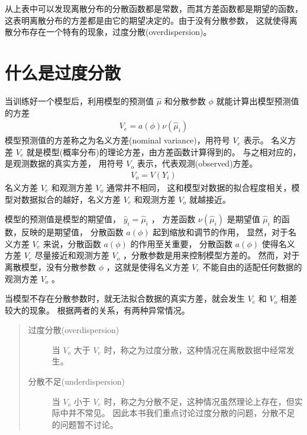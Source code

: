 \documentclass[letterpaper,10pt,english]{sphinxmanual}
\begin{document}
从上表中可以发现离散分布的分散函数都是常数，而其方差函数都是期望的函数，
这表明离散分布的方差都是由它的期望决定的。由于没有分散参数，
这就使得离散分布存在一个特有的现象，过度分散(overdispersion)。


\section{什么是过度分散}
\label{\detokenize{_u8fc7_u5ea6_u5206_u6563/content:id2}}
当训练好一个模型后，利用模型的预测值 \(\hat{\mu}\) 和分散参数 \(\phi\)
就能计算出模型预测值的方差
\begin{equation}\label{equation:过度分散/content:过度分散/content:1}
\begin{split}V_e = a(\phi)\nu(\hat{\mu}_i)\end{split}
\end{equation}
模型预测值的方差称之为名义方差(nominal variance)，用符号 \(V_{e}\) 表示。
名义方差 \(V_e\) 就是模型(概率分布)的理论方差，由方差函数计算得到的。
与之相对应的，是观测数据的真实方差，
用符号 \(V_{o}\) 表示，代表观测(observed)方差。
\begin{equation}\label{equation:过度分散/content:过度分散/content:2}
\begin{split}V_{o} = V(Y_i)\end{split}
\end{equation}
名义方差 \(V_e\) 和观测方差 \(V_{o}\) 通常并不相同，
这和模型对数据的拟合程度相关，模型对数据拟合的越好，名义方差 \(V_e\) 和观测方差 \(V_{o}\)
就越接近。

模型的预测值是模型的期望值， \(\hat{y}_i=\hat{\mu}_i\) ，
方差函数 \(\nu(\hat{\mu}_i)\) 是期望值
\(\hat{\mu}_i\) 的函数，反映的是期望值，
分散函数 \(a(\phi)\) 起到缩放和调节的作用，
显然，对于名义方差 \(V_e\) 来说，分散函数 \(a(\phi)\) 的作用至关重要，
分散函数 \(a(\phi)\) 使得名义方差 \(V_e\) 尽量接近和观测方差 \(V_{o}\)
，分散参数是用来控制模型方差的。
然而，对于离散模型，没有分散参数 \(\phi\)
，这就是使得名义方差 \(V_e\) 不能自由的适配任何数据的观测方差 \(V_{o}\) 。

当模型不存在分散参数时，就无法拟合数据的真实方差，就会发生
\(V_e\) 和 \(V_o\) 相差较大的现象。
根据两者的关系，有两种异常情况。
\begin{quote}\begin{description}
\item[{过度分散(overdispersion)}] \leavevmode
当 \(V_{o}\) 大于 \(V_e\) 时，称之为过度分散，这种情况在离散数据中经常发生。

\item[{分散不足(underdispersion)}] \leavevmode
当 \(V_{o}\) 小于 \(V_e\) 时，称之为分散不足，这种情况虽然理论上存在，但实际中并不常见。
因此本书我们重点讨论过度分散的问题，分散不足的问题暂不讨论。

\end{description}\end{quote}
\end{document}
